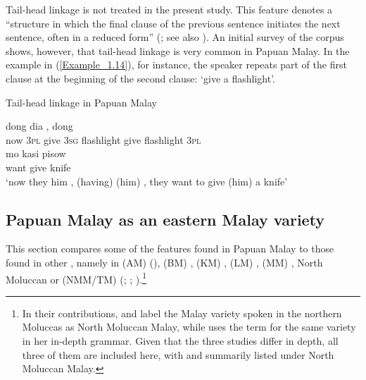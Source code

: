 { 
Tail-head linkage is not treated in the present study. This feature denotes a  ``structure in which the final clause of the previous sentence initiates the next sentence, often in a reduced form'' (\citealt[390]{Foley.2000}; see also \citealt{deVries.2005}). An initial survey of the corpus shows, however, that tail-head linkage is very common in Papuan Malay. In the example in (\ref{Example_1.14}), for instance, the speaker repeats part of the first clause at the beginning of the second clause:  ‘give a flashlight’.


\begin{styleExampleTitle}
Tail-head linkage in Papuan Malay
\end{styleExampleTitle}
\ea
\label{Example_1.14}
  {dong} {} {dia} {,} {} {} {dong}\\ %
{now} {\textsc{3pl}} give \textsc{3sg} flashlight give flashlight \textsc{3pl}\\
\gll mo {kasi} {pisow}\\
want {give} {knife}\\
\glt
‘now they  him , (having)  (him) , they want to give (him) a knife’ \textstyleExampleSource{[081108-003-JR.0002]}
\z


\subsection{Papuan Malay as an eastern Malay variety}\label{Para_1.6.3}
This section compares some of the features found in Papuan Malay to those found in other , namely in  (AM) (\citealt{vanMinde.1997}),  (BM) {\citep{Paauw.2009}},  (KM) {\citep{Steinhauer.1983}},  (LM) \citep{Paauw.2009},  (MM) {\citep{Stoel.2005}}, North Moluccan or  (NMM/TM) (\citealt{Taylor.1983}; \citealt{Voorhoeve.1983}; \citealt{Litamahuputty.2012}).\footnote{In their contributions, {\citet{Taylor.1983}} and {\citet{Voorhoeve.1983}} label the Malay variety spoken in the northern Moluccas as North Moluccan Malay, while {\citet{Litamahuputty.2012}} uses the term  for the same variety in her in-depth grammar. Given that the three studies differ in depth, all three of them are included here, with  and  summarily listed under North Moluccan Malay.}



}
